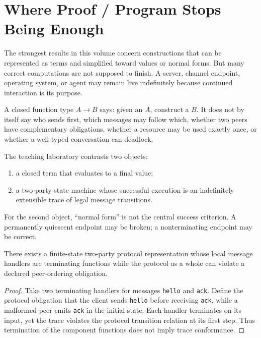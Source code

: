 \chapter{Where Proof / Program Stops Being Enough}
\label{ch:protocol-threshold}

The strongest results in this volume concern constructions that can be represented as terms and simplified toward values or normal forms. But many correct computations are not supposed to finish. A server, channel endpoint, operating system, or agent may remain live indefinitely because continued interaction is its purpose.



A closed function type $A\to B$ says: given an $A$, construct a $B$. It does not by itself say who sends first, which messages may follow which, whether two peers have complementary obligations, whether a resource may be used exactly once, or whether a well-typed conversation can deadlock.

The teaching laboratory contrasts two objects:
\begin{enumerate}
\item a closed term that evaluates to a final value;
\item a two-party state machine whose successful execution is an indefinitely extensible trace of legal message transitions.
\end{enumerate}
For the second object, “normal form” is not the central success criterion. A permanently quiescent endpoint may be broken; a nonterminating endpoint may be correct.

\begin{proposition}
There exists a finite-state two-party protocol representation whose local message handlers are terminating functions while the protocol as a whole can violate a declared peer-ordering obligation.
\end{proposition}
\begin{proof}
Take two terminating handlers for messages \texttt{hello} and \texttt{ack}. Define the protocol obligation that the client sends \texttt{hello} before receiving \texttt{ack}, while a malformed peer emits \texttt{ack} in the initial state. Each handler terminates on its input, yet the trace violates the protocol transition relation at its first step. Thus termination of the component functions does not imply trace conformance.
\end{proof}

